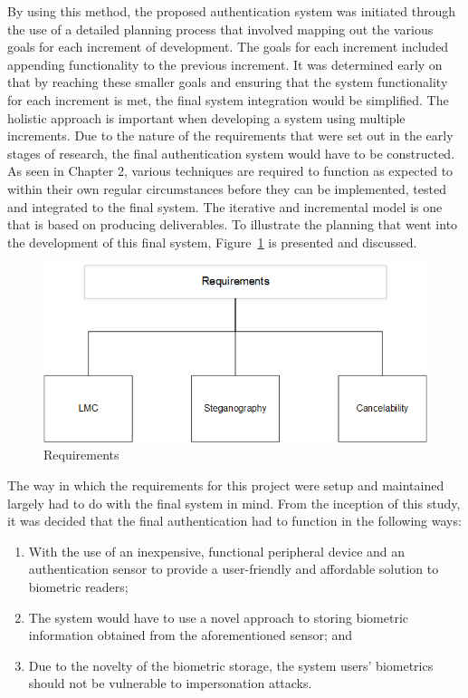 By using this method, the proposed authentication system was initiated through the use of a detailed planning process that involved mapping out the various goals for each increment of development. The goals for each increment included appending functionality to the previous increment. It was determined early on that by reaching these smaller goals and ensuring that the system functionality for each increment is met, the final system integration would be simplified. The holistic approach is important when developing a system using multiple increments. Due to the nature of the requirements that were set out in the early stages of research, the final authentication system would have to be constructed. As seen in Chapter 2, various techniques are required to function as expected to within their own regular circumstances before they can be implemented, tested and integrated to the final system. 
The iterative and incremental model is one that is based on producing deliverables. To illustrate the planning that went into the development of this final system, Figure~\ref{fig:Requirements} is presented and discussed. 

    
    \begin{figure}[htbp!] 
    \centering    
    \includegraphics[width=1.0\textwidth]{Chapter3/Figs/Figure3-2.png}
    \caption[Requirements]{Requirements}
    \label{fig:Requirements}
    \end{figure}    
    
    The way in which the requirements for this project were setup and maintained largely had to do with the final system in mind. From the inception of this study, it was decided that the final authentication had to function in the following ways:
    
    \begin{enumerate}[label=\roman*.]
    	\item With the use of an inexpensive, functional peripheral device and an authentication sensor to provide a user-friendly and affordable solution to biometric readers;
    	\item The system would have to use a novel approach to storing biometric information obtained from the aforementioned sensor; and
    	\item Due to the novelty of the biometric storage, the system users’ biometrics should not be vulnerable to impersonation attacks.
    \end{enumerate}
    
